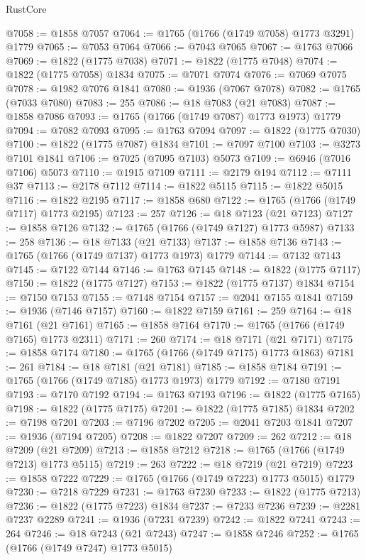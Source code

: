 \begin{lexlean}{RustCore}
\begin{coremodule}
@7058 := @1858 @7057
@7064 := @1765 (@1766 (@1749 @7058) @1773 @3291) @1779
@7065 := @7053 @7064
@7066 := @7043 @7065
@7067 := @1763 @7066
@7069 := @1822 (@1775 @7038)
@7071 := @1822 (@1775 @7048)
@7074 := @1822 (@1775 @7058) @1834
@7075 := @7071 @7074
@7076 := @7069 @7075
@7078 := @1982 @7076 @1841
@7080 := @1936 (@7067 @7078)
@7082 := @1765 (@7033 @7080)
@7083 := 255
@7086 := @18 @7083 (@21 @7083)
@7087 := @1858 @7086
@7093 := @1765 (@1766 (@1749 @7087) @1773 @1973) @1779
@7094 := @7082 @7093
@7095 := @1763 @7094
@7097 := @1822 (@1775 @7030)
@7100 := @1822 (@1775 @7087) @1834
@7101 := @7097 @7100
@7103 := @3273 @7101 @1841
@7106 := @7025 (@7095 @7103) @5073
@7109 := @6946 (@7016 @7106) @5073
@7110 := @1915 @7109
@7111 := @2179 @194
@7112 := @7111 @37
@7113 := @2178 @7112
@7114 := @1822 @5115
@7115 := @1822 @5015
@7116 := @1822 @2195
@7117 := @1858 @680
@7122 := @1765 (@1766 (@1749 @7117) @1773 @2195)
@7123 := 257
@7126 := @18 @7123 (@21 @7123)
@7127 := @1858 @7126
@7132 := @1765 (@1766 (@1749 @7127) @1773 @5987)
@7133 := 258
@7136 := @18 @7133 (@21 @7133)
@7137 := @1858 @7136
@7143 := @1765 (@1766 (@1749 @7137) @1773 @1973) @1779
@7144 := @7132 @7143
@7145 := @7122 @7144
@7146 := @1763 @7145
@7148 := @1822 (@1775 @7117)
@7150 := @1822 (@1775 @7127)
@7153 := @1822 (@1775 @7137) @1834
@7154 := @7150 @7153
@7155 := @7148 @7154
@7157 := @2041 @7155 @1841
@7159 := @1936 (@7146 @7157)
@7160 := @1822 @7159
@7161 := 259
@7164 := @18 @7161 (@21 @7161)
@7165 := @1858 @7164
@7170 := @1765 (@1766 (@1749 @7165) @1773 @2311)
@7171 := 260
@7174 := @18 @7171 (@21 @7171)
@7175 := @1858 @7174
@7180 := @1765 (@1766 (@1749 @7175) @1773 @1863)
@7181 := 261
@7184 := @18 @7181 (@21 @7181)
@7185 := @1858 @7184
@7191 := @1765 (@1766 (@1749 @7185) @1773 @1973) @1779
@7192 := @7180 @7191
@7193 := @7170 @7192
@7194 := @1763 @7193
@7196 := @1822 (@1775 @7165)
@7198 := @1822 (@1775 @7175)
@7201 := @1822 (@1775 @7185) @1834
@7202 := @7198 @7201
@7203 := @7196 @7202
@7205 := @2041 @7203 @1841
@7207 := @1936 (@7194 @7205)
@7208 := @1822 @7207
@7209 := 262
@7212 := @18 @7209 (@21 @7209)
@7213 := @1858 @7212
@7218 := @1765 (@1766 (@1749 @7213) @1773 @5115)
@7219 := 263
@7222 := @18 @7219 (@21 @7219)
@7223 := @1858 @7222
@7229 := @1765 (@1766 (@1749 @7223) @1773 @5015) @1779
@7230 := @7218 @7229
@7231 := @1763 @7230
@7233 := @1822 (@1775 @7213)
@7236 := @1822 (@1775 @7223) @1834
@7237 := @7233 @7236
@7239 := @2281 @7237 @2289
@7241 := @1936 (@7231 @7239)
@7242 := @1822 @7241
@7243 := 264
@7246 := @18 @7243 (@21 @7243)
@7247 := @1858 @7246
@7252 := @1765 (@1766 (@1749 @7247) @1773 @5015)

\end{coremodule}
\end{lexlean}
